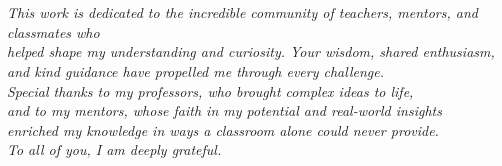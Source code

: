 \chapter*{}
\vspace*{\fill}

\begin{center}
\begin{minipage}{0.75\textwidth}
\itshape
    This work is dedicated to the incredible community of teachers, mentors, and classmates who \\
    helped shape my understanding and curiosity. Your wisdom, shared enthusiasm, \\
    and kind guidance have propelled me through every challenge.\\[1.0em]
    Special thanks to my professors, who brought complex ideas to life, \\
    and to my mentors, whose faith in my potential and real-world insights \\
    enriched my knowledge in ways a classroom alone could never provide.\\[1.0em]
    To all of you, I am deeply grateful.
\end{minipage}
\end{center}

\vspace*{\fill}
\newpage
